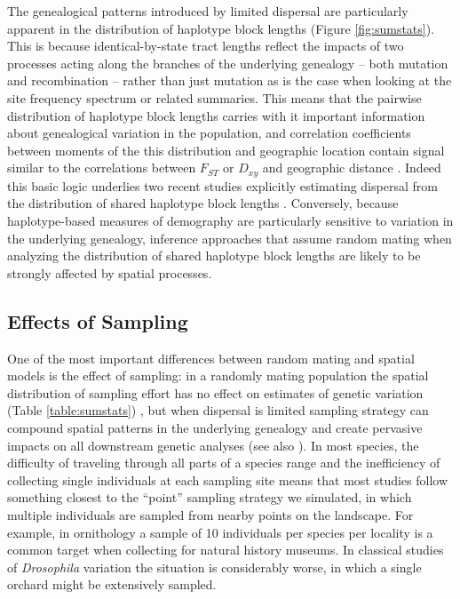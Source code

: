 \documentclass[10pt,twoside,lineno,hidelinks]{preprint} %
\begin{document}
The genealogical patterns introduced by limited dispersal are particularly apparent in the distribution of haplotype block lengths (Figure \ref{fig:sumstats}). This is because identical-by-state tract lengths reflect the impacts of two processes acting along the branches of the underlying genealogy -- both mutation and recombination -- rather than just mutation as is the case when looking at the site frequency spectrum or related summaries. This means that the pairwise distribution of haplotype block lengths carries with it important information about genealogical variation in the population, and correlation coefficients between moments of the this distribution and geographic location contain signal similar to the correlations between $F_{ST}$ or $D_{xy}$ and geographic distance \citep{Rousset1997}. Indeed this basic logic underlies two recent studies explicitly estimating dispersal from the distribution of shared haplotype block lengths \citep{Ringbauer2017,Baharian2016}. Conversely, because haplotype-based measures of demography are particularly sensitive to variation in the underlying genealogy, inference approaches that assume random mating when analyzing the distribution of shared haplotype block lengths are likely to be strongly affected by spatial processes. 

\subsection{Effects of Sampling}

One of the most important differences between random mating and spatial models is the effect of sampling: 
in a randomly mating population the spatial distribution of sampling effort has no effect on estimates of genetic variation (Table \ref{table:sumstats}) , 
but when dispersal is limited sampling strategy can compound spatial patterns in the underlying genealogy and create pervasive impacts on all downstream genetic analyses (see also \citet{Stadler2009}). 
In most species,
the difficulty of traveling through all parts of a species range and the inefficiency of collecting single individuals at each sampling site 
means that most studies follow something closest to the ``point'' sampling strategy we simulated, 
in which multiple individuals are sampled from nearby points on the landscape. 
For example, in ornithology a sample of 10 individuals per species per locality is a common target when collecting for natural history museums. 
In classical studies of \textit{Drosophila} variation the situation is considerably worse, in which a single orchard might be extensively sampled.
\end{document}
